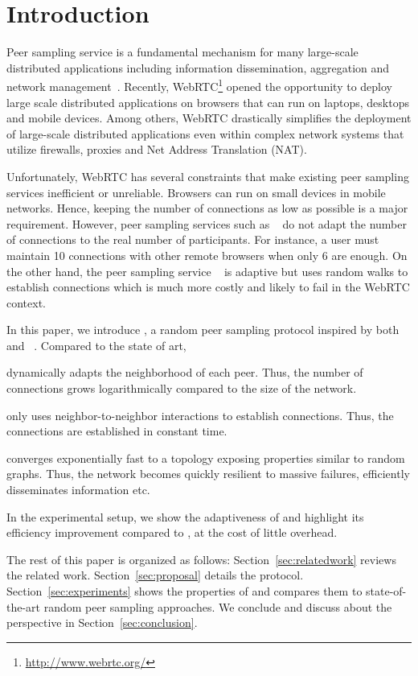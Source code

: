 
\section{Introduction}

Peer sampling service is a fundamental mechanism for many large-scale
distributed applications including information dissemination, aggregation and
network management~\cite{jelasity2007gossip}. Recently,
WebRTC\footnote{\url{http://www.webrtc.org/}} opened the opportunity to deploy
large scale distributed applications on brow\-sers that can run on laptops,
desktops and mobile devices. Among others, WebRTC drastically simplifies
the deployment of large-scale distributed applications even within complex
network systems that utilize firewalls, proxies and Net Address Translation
(NAT).

Unfortunately, WebRTC has several constraints that make existing peer
sampling services inefficient or unreliable. Brow\-sers can run
on small devices in mobile networks. Hence, keeping the number of
connections as low as possible is a major requirement. However, peer
sampling services such as \CYCLON~\cite{voulgaris2005cyclon} do not
adapt the number of connections to the real number of
participants. For instance, a user must maintain 10 connections with
other remote browsers when only 6 are enough. On the other hand, the
peer sampling service \SCAMP~\cite{ganesh2003peer} is adaptive but
uses random walks to establish connections which is much more
costly and likely to fail in the WebRTC context.

In this paper, we introduce \SPRAY, a random peer sampling protocol inspired
by both \CYCLON~\cite{voulgaris2005cyclon} and
\SCAMP~\cite{ganesh2003peer}. Compared to the state of art,
\begin{inparaenum}[(i)]
\item \SPRAY dynamically adapts the neighborhood of each peer. Thus, the number
  of connections grows logarithmically compared to the size of the network.
\item \SPRAY only uses neighbor-to-neighbor interactions to establish
  connections. Thus, the connections are established in constant time.
\item \SPRAY converges exponentially fast to a topology exposing properties
  similar to random graphs. Thus, the network becomes quickly resilient to
  massive failures, efficiently disseminates information etc.
\item In the experimental setup, we show the adaptiveness of \SPRAY and
  highlight its efficiency improvement compared to \CYCLON, at the cost of
  little overhead.
\end{inparaenum}

The rest of this paper is organized as follows: Section~\ref{sec:relatedwork}
reviews the related work. Section~\ref{sec:proposal} details the \SPRAY
protocol. Section~\ref{sec:experiments} shows the properties of \SPRAY
and compares them to state-of-the-art random peer sampling approaches. We
conclude and discuss about the perspective in Section~\ref{sec:conclusion}.

